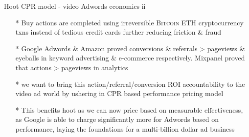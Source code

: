 \documentclass[11pt,handout]{beamer}
\begin{document}
\begin{frame}[t]{Hoot CPR model - video Adwords economics ii}
\begin{itemize}[<+-| alert@+>]

\item[*]Buy actions are completed using irreversible \textsc{Bitcoin ETH} cryptocurrency txns instead of tedious credit cards further reducing friction \& fraud
\item[*]Google Adwords \& Amazon proved conversions \& referrals > pageviews \& eyeballs in keyword advertising \& e-commerce respectively. Mixpanel proved that actions > pageviews in analytics
\item[*]we want to bring this action/referral/conversion ROI accountability to the video ad world by ushering in CPR based performance pricing model
\item[*]This benefits hoot as we can now price based on measurable effectiveness, as Google is able to charge significantly more for Adwords based on performance, laying the foundations for a multi-billion dollar ad business

\end{itemize}
\end{frame}
\end{document}
